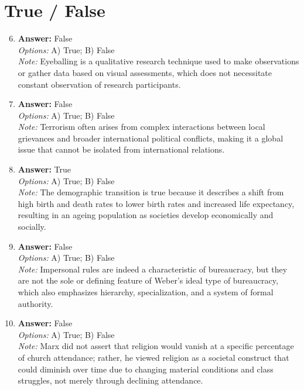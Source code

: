 \documentclass[12pt]{article}
\begin{document}
\section*{True / False}
\begin{enumerate}[label=\arabic*.]
\setcounter{enumi}{5}
\item \textbf{Answer:} False
\\ \textit{Options:} A) True; B) False
\\ \textit{Note:} Eyeballing is a qualitative research technique used to make observations or gather data based on visual assessments, which does not necessitate constant observation of research participants.
\item \textbf{Answer:} False
\\ \textit{Options:} A) True; B) False
\\ \textit{Note:} Terrorism often arises from complex interactions between local grievances and broader international political conflicts, making it a global issue that cannot be isolated from international relations.
\item \textbf{Answer:} True
\\ \textit{Options:} A) True; B) False
\\ \textit{Note:} The demographic transition is true because it describes a shift from high birth and death rates to lower birth rates and increased life expectancy, resulting in an ageing population as societies develop economically and socially.
\item \textbf{Answer:} False
\\ \textit{Options:} A) True; B) False
\\ \textit{Note:} Impersonal rules are indeed a characteristic of bureaucracy, but they are not the sole or defining feature of Weber's ideal type of bureaucracy, which also emphasizes hierarchy, specialization, and a system of formal authority.
\item \textbf{Answer:} False
\\ \textit{Options:} A) True; B) False
\\ \textit{Note:} Marx did not assert that religion would vanish at a specific percentage of church attendance; rather, he viewed religion as a societal construct that could diminish over time due to changing material conditions and class struggles, not merely through declining attendance.
\end{enumerate}
\end{document}
